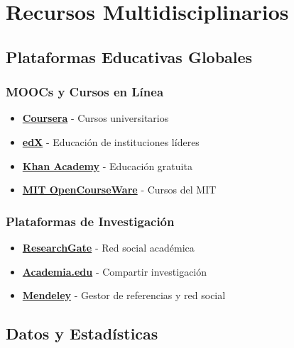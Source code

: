\documentclass[
  jou,
  floatsintext,
  longtable,
  a4paper,
  nolmodern,
  notxfonts,
  notimes,
  12pt,
  colorlinks=true,linkcolor=blue,citecolor=blue,urlcolor=blue]{apa7}
\providecommand{\tightlist}{%
  \setlength{\itemsep}{0pt}\setlength{\parskip}{0pt}}
\begin{document}
\section{Recursos
Multidisciplinarios}\label{recursos-multidisciplinarios}

\subsection{Plataformas Educativas
Globales}\label{plataformas-educativas-globales}

\subsubsection{MOOCs y Cursos en
Línea}\label{moocs-y-cursos-en-luxednea}

\begin{itemize}
\tightlist
\item
  \textbf{\href{https://www.coursera.org/}{Coursera}} - Cursos
  universitarios
\item
  \textbf{\href{https://www.edx.org/}{edX}} - Educación de instituciones
  líderes
\item
  \textbf{\href{https://www.khanacademy.org/}{Khan Academy}} - Educación
  gratuita
\item
  \textbf{\href{https://ocw.mit.edu/}{MIT OpenCourseWare}} - Cursos del
  MIT
\end{itemize}

\subsubsection{Plataformas de
Investigación}\label{plataformas-de-investigaciuxf3n}

\begin{itemize}
\tightlist
\item
  \textbf{\href{https://www.researchgate.net/}{ResearchGate}} - Red
  social académica
\item
  \textbf{\href{https://www.academia.edu/}{Academia.edu}} - Compartir
  investigación
\item
  \textbf{\href{https://www.mendeley.com/}{Mendeley}} - Gestor de
  referencias y red social
\end{itemize}

\subsection{Datos y Estadísticas}\label{datos-y-estaduxedsticas}
\end{document}
